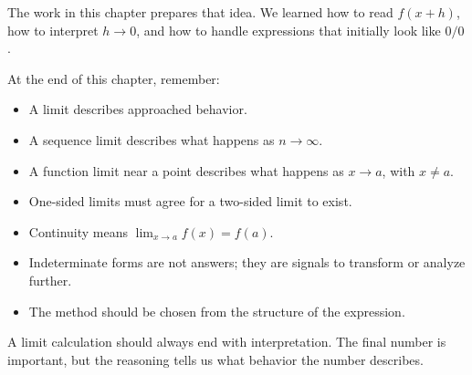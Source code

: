 The work in this chapter prepares that idea. We learned how to read \(f(x+h)\), how to interpret \(h\to0\), and how to handle expressions that initially look like \(0/0\).

\begin{summarybox}
At the end of this chapter, remember:
\begin{itemize}
\item A limit describes approached behavior.
\item A sequence limit describes what happens as \(n\to\infty\).
\item A function limit near a point describes what happens as \(x\to a\), with \(x\ne a\).
\item One-sided limits must agree for a two-sided limit to exist.
\item Continuity means \(\lim_{x\to a}f(x)=f(a)\).
\item Indeterminate forms are not answers; they are signals to transform or analyze further.
\item The method should be chosen from the structure of the expression.
\end{itemize}
\end{summarybox}

A limit calculation should always end with interpretation. The final number is important, but the reasoning tells us what behavior the number describes.